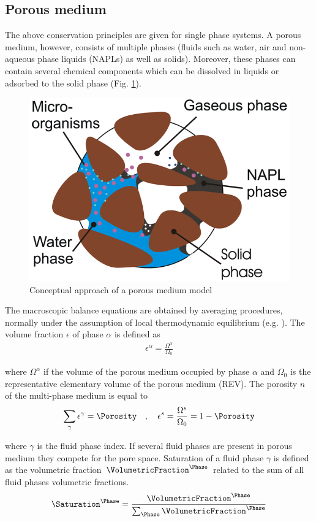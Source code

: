 \subsection{Porous medium}

The above conservation principles are given for single phase systems.
A porous medium, however, consists of multiple phases (fluids such as water, air and non-aqueous phase liquids (NAPLs) as well as solids). 
Moreover, these phases can contain several chemical components which can be dissolved in liquids or adsorbed to the solid phase (Fig. \ref{fig:pm1}).

\vspace{4cm}
\begin{figure}[htbp]
\hspace{3cm}
\includegraphics[width=0.06\columnwidth]{figures/pm.png}
\caption{Conceptual approach of a porous medium model}
\label{fig:pm1}
\end{figure}

The macroscopic balance equations are obtained by averaging procedures, normally under the assumption of local thermodynamic equilibrium (e.g. \cite{HasGra:79,Die:85}).
The volume fraction $\epsilon$ of phase $\alpha$ is defined as
%
\begin{eqnarray}
\epsilon^\alpha
= \frac{\Omega^\alpha}{\Omega_0}
\end{eqnarray}

where $\Omega^\alpha$ if the volume of the porous medium occupied by phase $\alpha$ and $\Omega_0$ is the representative elementary volume of the porous medium (REV).
The porosity $n$ of the multi-phase medium is equal to
%
\begin{eqnarray}
\sum_\gamma \epsilon^\gamma
= 
\Porosity
\quad,\quad
\epsilon^s
= \frac{\Omega^s}{\Omega_0}
= 1-\Porosity
\end{eqnarray}

where $\gamma$ is the fluid phase index.
If several fluid phases are present in porous medium they compete for the pore space.
%
Saturation of a fluid phase $\gamma$ is defined as the volumetric
fraction $\VolumetricFraction^\Phase$ related to the sum of all
fluid phases volumetric fractions.
\begin{eqnarray}
\Saturation^\Phase
=
\frac{\VolumetricFraction^\Phase}{\sum_\Phase \VolumetricFraction^\Phase}
\end{eqnarray}

